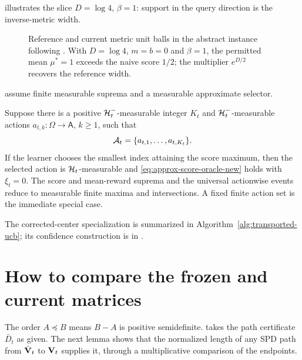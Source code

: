  illustrates the slice $D=\log4$,
$\beta=1$: support in the query direction is the inverse-metric width.

\begin{figure}[t]
 \centering
 
 \caption{Reference and current metric unit balls in the abstract instance
 following . With $D=\log4$, $m=b=0$ and
 $\beta=1$, the permitted mean $\mu^*=1$ exceeds the naive score $1/2$;
 the multiplier $e^{D/2}$ recovers the reference width.}
 \label{fig:transport-confidence-geometry}
\end{figure}

 assume finite measurable
suprema and a measurable approximate selector.

\begin{corollary}
\label{cor:finite-enumeration-new}
Suppose there is a positive $\mathcal{H}_t^-$-measurable integer $K_t$ and
$\mathcal{H}_t^-$-measurable actions $a_{t,k}:\Omega\to\mathsf A$, $k\ge1$, such
that
\[
 \mathcal{A}_t=\{a_{t,1},\ldots,a_{t,K_t}\}.
\]
If the learner chooses the smallest index attaining the score maximum, then the
selected action is $\mathcal{H}_t$-measurable and
\eqref{eq:approx-score-oracle-new} holds with $\xi_t=0$.  The score and
mean-reward suprema and the universal actionwise events reduce to measurable
finite maxima and intersections.  A fixed finite action set is the immediate
special case.
\end{corollary}

The corrected-center specialization is summarized in
Algorithm~\ref{alg:transported-ucb}; its confidence construction is in
.



\section{How to compare the frozen and current matrices}
\label{sec:logarithmic-transport}

The order $A\preceq B$ means $B-A$ is positive semidefinite.
 takes the path certificate $\bar D_t$ as given. The
next lemma shows that the normalized length of any SPD path from $\bar{\mathbf{V}}_t$ to
$\mathbf{V}_t$ supplies it, through a multiplicative comparison of the endpoints.

